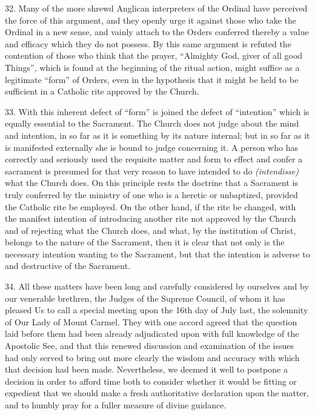 32. Many of the more shrewd Anglican interpreters of the Ordinal have
perceived the force of this argument, and they openly urge it against
those who take the Ordinal in a new sense, and vainly attach to the
Orders conferred thereby a value and efficacy which they do not possess.
By this same argument is refuted the contention of those who think that
the prayer, ``Almighty God, giver of all good Things'', which is found
at the beginning of the ritual action, might suffice as a legitimate
``form'' of Orders, even in the hypothesis that it might be held to be
sufficient in a Catholic rite approved by the Church.

33. With this inherent defect of ``form'' is joined the defect of
``intention'' which is equally essential to the Sacrament. The Church
does not judge about the mind and intention, in so far as it is
something by its nature internal; but in so far as it is manifested
externally she is bound to judge concerning it. A person who has
correctly and seriously used the requisite matter and form to effect and
confer a sacrament is presumed for that very reason to have intended to
do \emph{(intendisse)} what the Church does. On this principle rests the
doctrine that a Sacrament is truly conferred by the ministry of one who
is a heretic or unbaptized, provided the Catholic rite be employed. On
the other hand, if the rite be changed, with the manifest intention of
introducing another rite not approved by the Church and of rejecting
what the Church does, and what, by the institution of Christ, belongs to
the nature of the Sacrament, then it is clear that not only is the
necessary intention wanting to the Sacrament, but that the intention is
adverse to and destructive of the Sacrament.

34. All these matters have been long and carefully considered by
ourselves and by our venerable brethren, the Judges of the Supreme
Council, of whom it has pleased Us to call a special meeting upon the
16th day of July last, the solemnity of Our Lady of Mount Carmel. They
with one accord agreed that the question laid before them had been
already adjudicated upon with full knowledge of the Apostolic See, and
that this renewed discussion and examination of the issues had only
served to bring out more clearly the wisdom and accuracy with which that
decision had been made. Nevertheless, we deemed it well to postpone a
decision in order to afford time both to consider whether it would be
fitting or expedient that we should make a fresh authoritative
declaration upon the matter, and to humbly pray for a fuller measure of
divine guidance.

